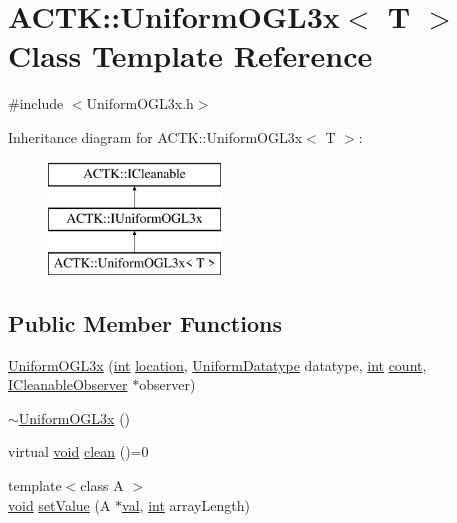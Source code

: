 \hypertarget{class_a_c_t_k_1_1_uniform_o_g_l3x}{\section{A\-C\-T\-K\-:\-:Uniform\-O\-G\-L3x$<$ T $>$ Class Template Reference}
\label{class_a_c_t_k_1_1_uniform_o_g_l3x}
}


{\ttfamily \#include $<$Uniform\-O\-G\-L3x.\-h$>$}

Inheritance diagram for A\-C\-T\-K\-:\-:Uniform\-O\-G\-L3x$<$ T $>$\-:\begin{figure}[H]
\begin{center}
\leavevmode
\includegraphics[height=3.000000cm]{class_a_c_t_k_1_1_uniform_o_g_l3x}
\end{center}
\end{figure}
\subsection*{Public Member Functions}
\begin{DoxyCompactItemize}
\item 
\hyperlink{class_a_c_t_k_1_1_uniform_o_g_l3x_a1df7dca3ac9bb6eaba9254980984e882}{Uniform\-O\-G\-L3x} (\hyperlink{wglew_8h_a500a82aecba06f4550f6849b8099ca21}{int} \hyperlink{glew_8h_a050778a7129cc14e57da7024beb87ce8}{location}, \hyperlink{namespace_a_c_t_k_a0206df759d1628359ad73c2acea69d0e}{Uniform\-Datatype} datatype, \hyperlink{wglew_8h_a500a82aecba06f4550f6849b8099ca21}{int} \hyperlink{glew_8h_a10b284d589000663becfbc6867a3a9f7}{count}, \hyperlink{class_a_c_t_k_1_1_i_cleanable_observer}{I\-Cleanable\-Observer} $\ast$observer)
\item 
\hyperlink{class_a_c_t_k_1_1_uniform_o_g_l3x_ada6da45d1f85b82a3ac53ad92ef5a4c6}{$\sim$\-Uniform\-O\-G\-L3x} ()
\item 
virtual \hyperlink{wglew_8h_aeea6e3dfae3acf232096f57d2d57f084}{void} \hyperlink{class_a_c_t_k_1_1_uniform_o_g_l3x_ab94e9de72299648a82fc6867f203dcfa}{clean} ()=0
\item 
{\footnotesize template$<$class A $>$ }\\\hyperlink{wglew_8h_aeea6e3dfae3acf232096f57d2d57f084}{void} \hyperlink{class_a_c_t_k_1_1_uniform_o_g_l3x_a2ccf319706042325c36a06d02e010c34}{set\-Value} (A $\ast$\hyperlink{glew_8h_a26942fd2ed566ef553eae82d2c109c8f}{val}, \hyperlink{wglew_8h_a500a82aecba06f4550f6849b8099ca21}{int} array\-Length)
\end{DoxyCompactItemize}
